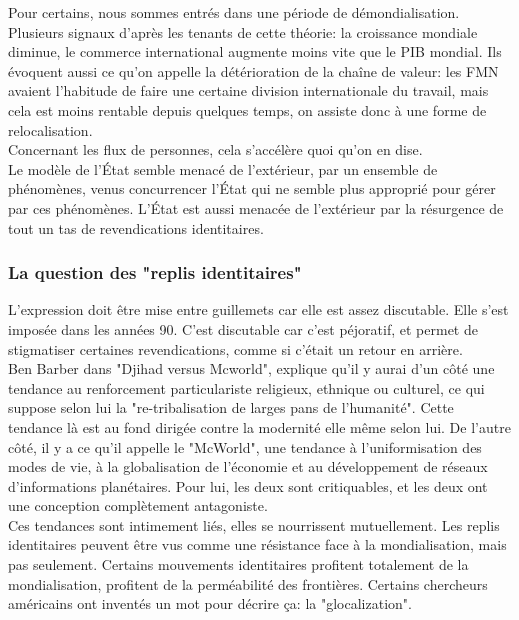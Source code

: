 \documentclass[10pt, a4paper, openany]{book}
\begin{document}
Pour certains, nous sommes entrés dans une période de démondialisation. Plusieurs signaux d'après les tenants de cette théorie: la croissance mondiale diminue, le commerce international augmente moins vite que le PIB mondial. Ils évoquent aussi ce qu'on appelle la détérioration de la chaîne de valeur: les FMN avaient l'habitude de faire une certaine division internationale du travail, mais cela est moins rentable depuis quelques temps, on assiste donc à une forme de relocalisation. \\
Concernant les flux de personnes, cela s'accélère quoi qu'on en dise. \\
Le modèle de l'État semble menacé de l'extérieur, par un ensemble de phénomènes, venus concurrencer l'État qui ne semble plus approprié pour gérer par ces phénomènes. L'État est aussi menacée de l'extérieur par la résurgence de tout un tas de revendications identitaires. 

\subsubsection{La question des "replis identitaires"}

L'expression doit être mise entre guillemets car elle est assez discutable. Elle s'est imposée dans les années 90. C'est discutable car c'est péjoratif, et permet de stigmatiser certaines revendications, comme si c'était un retour en arrière. \\
Ben Barber dans "Djihad versus Mcworld", explique qu'il y aurai d'un côté une tendance au renforcement particulariste religieux, ethnique ou culturel, ce qui suppose selon lui la "re-tribalisation de larges pans de l'humanité". Cette tendance là est au fond dirigée contre la modernité elle même selon lui. De l'autre côté, il y a ce qu'il appelle le "McWorld", une tendance à l'uniformisation des modes de vie, à la globalisation de l'économie et au développement de réseaux d'informations planétaires. Pour lui, les deux sont critiquables, et les deux ont une conception complètement antagoniste. \\
Ces tendances sont intimement liés, elles se nourrissent mutuellement. Les replis identitaires peuvent être vus comme une résistance face à la mondialisation, mais pas seulement. Certains mouvements identitaires profitent totalement de la mondialisation, profitent de la perméabilité des frontières. Certains chercheurs américains ont inventés un mot pour décrire ça: la "glocalization". 
\end{document}
